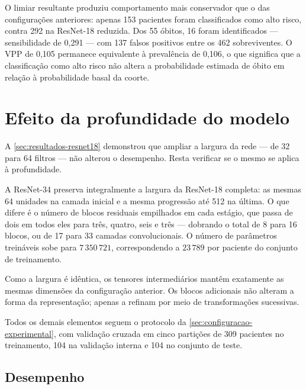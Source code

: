 O limiar resultante produziu comportamento mais conservador que o das
configurações anteriores: apenas 153 pacientes foram classificados como alto
risco, contra 292 na ResNet-18 reduzida. Dos 55 óbitos, 16 foram
identificados --- sensibilidade de 0,291 --- com 137 falsos positivos entre
os 462 sobreviventes. O \gls{VPP} de 0,105 permanece equivalente à
prevalência de 0,106, o que significa que a classificação como alto risco não
altera a probabilidade estimada de óbito em relação à probabilidade basal da
coorte.


%

\section{Efeito da profundidade do modelo}
\label{sec:resultados-resnet34}

A \autoref{sec:resultados-resnet18} demonstrou que ampliar a largura da rede
--- de 32 para 64 filtros --- não alterou o desempenho. Resta verificar se o
mesmo se aplica à profundidade.

A ResNet-34 preserva integralmente a largura da ResNet-18 completa: as
mesmas 64 unidades na camada inicial e a mesma progressão até 512 na última.
O que difere é o número de blocos residuais empilhados em cada estágio,
que passa de dois em todos eles para três, quatro, seis e três ---
dobrando o total de 8 para 16 blocos, ou de 17 para 33 camadas
convolucionais. O número de parâmetros treináveis sobe para $7\,350\,721$,
correspondendo a $23\,789$ por paciente do conjunto de treinamento.

Como a largura é idêntica, os tensores intermediários mantêm exatamente as
mesmas dimensões da configuração anterior. Os blocos adicionais não alteram
a forma da representação; apenas a refinam por meio de transformações
sucessivas.

Todos os demais elementos seguem o protocolo da
\autoref{sec:configuracao-experimental}, com validação cruzada em cinco
partições de 309 pacientes no treinamento, 104 na validação interna e 104 no
conjunto de teste.

\subsection{Desempenho}
\label{subsec:desempenho-resnet34}

